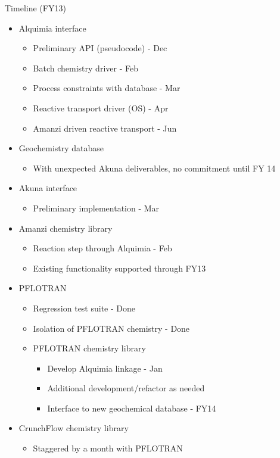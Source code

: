 \documentclass{beamer}
\newcommand{\pft}{PFLOTRAN\xspace}
\begin{document}
\begin{frame}[allowframebreaks]{Timeline (FY13)}
\begin{itemize}
\item Alquimia interface
\begin{itemize}
\item Preliminary API (pseudocode) - Dec
\item Batch chemistry driver - Feb
\item Process constraints with database - Mar
\item Reactive transport driver (OS) - Apr
\item Amanzi driven reactive transport - Jun
\end{itemize}
\item Geochemistry database
\begin{itemize}
\item With unexpected Akuna deliverables, no commitment until FY 14
\end{itemize}
\item Akuna interface
\begin{itemize}
\item Preliminary implementation - Mar
\end{itemize}

\newpage

\item Amanzi chemistry library
\begin{itemize}
\item Reaction step through Alquimia - Feb
\item Existing functionality supported through FY13
\end{itemize}
\item \pft
\begin{itemize}
\item Regression test suite - Done
\item Isolation of \pft chemistry - Done
\item \pft chemistry library
\begin{itemize}
\item Develop Alquimia linkage - Jan
\item Additional development/refactor as needed
\item Interface to new geochemical database - FY14
\end{itemize}
\end{itemize}
\item CrunchFlow chemistry library
\begin{itemize}
\item Staggered by a month with \pft
\end{itemize}
\end{itemize}
\end{frame}
\end{document}
